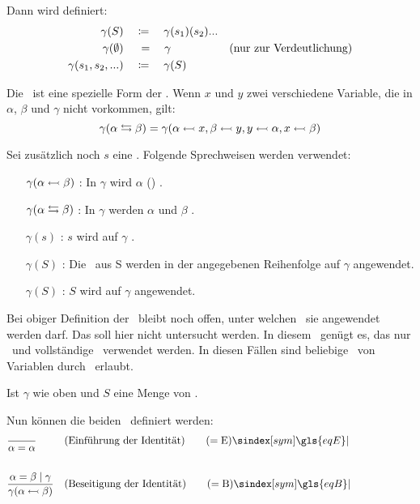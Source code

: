 {Dann wird definiert:
\begin{align}
	\gamma(S) & \quad \coloneqq \quad \gamma(s_1)(s_2)... \label{def:SubstitutionenAlt}\\
	\gamma(\emptyset) & \quad \; = \quad \gamma & \text{(nur zur Verdeutlichung)}\\
	\gamma(s_1,s_2,...) & \quad \coloneqq \quad \gamma(S)
\end{align}

Die \Vertauschung\ ist eine spezielle Form der \Substitution.
Wenn $x$ und $y$ zwei verschiedene Variable, die in $\alpha$, $\beta$ und $\gamma$ nicht vorkommen, gilt:
\[
	\gamma(\alpha \leftrightarrows \beta) = \gamma(\alpha\leftarrowtail x, \beta\leftarrowtail y,  y\leftarrowtail\alpha, x \leftarrowtail\beta)
\]

Sei zusätzlich noch $s$ eine \Substitution.
Folgende Sprechweisen werden verwendet:
\begin{itemize}
	\renewcommand*{\itemindent}{1,5cm}
	\renewcommand*{\labelsep}{5pt}
	\item [$\gamma(\alpha \leftarrowtail \beta)$ :] In $\gamma$ wird $\alpha$ () .
	\item [$\gamma(\alpha \leftrightarrows \beta)$ :] In $\gamma$ werden $\alpha$ und $\beta$ .
	\item [$\gamma(s)$ :] $s$ wird auf $\gamma$ .
	\item [$\gamma(S)$ :] Die \Substitutionen\ aus S werden in der angegebenen Reihenfolge auf $\gamma$ angewendet.
	\item [$\gamma(S)$ :] $S$ wird auf $\gamma$ angewendet.
\end{itemize}
%
Bei obiger Definition der \Substitution\ bleibt noch offen, unter welchen \Voraussetzungen\ sie angewendet werden darf. Das soll hier nicht untersucht werden. In diesem \sectionname\ genügt es, das nur \Vertauschung\ und vollständige \Substitution\ verwendet werden.
In diesen Fällen sind beliebige \Substitutionen\ von Variablen durch \Formeln\ erlaubt.

Ist $\gamma$ wie oben und $S$ eine Menge von \Substitutionen.

Nun können die beiden \Identitaetsregeln\ definiert werden:
\begin{align}
	& \frac{}{\alpha\eq\alpha}
	& & (\text{Einführung der Identität})
	\tag{\eqE} \sym{\gls{eqE}} \label{def:eqE}
	\\\\
	& \frac{\alpha\eq\beta \srand \gamma}{\gamma(\alpha\subst\beta)}
	& & (\text{Beseitigung der Identität})
	\tag{\eqB} \sym{\gls{eqB}} \label{def:eqB}
	\formulatoleft
\end{align}

}
